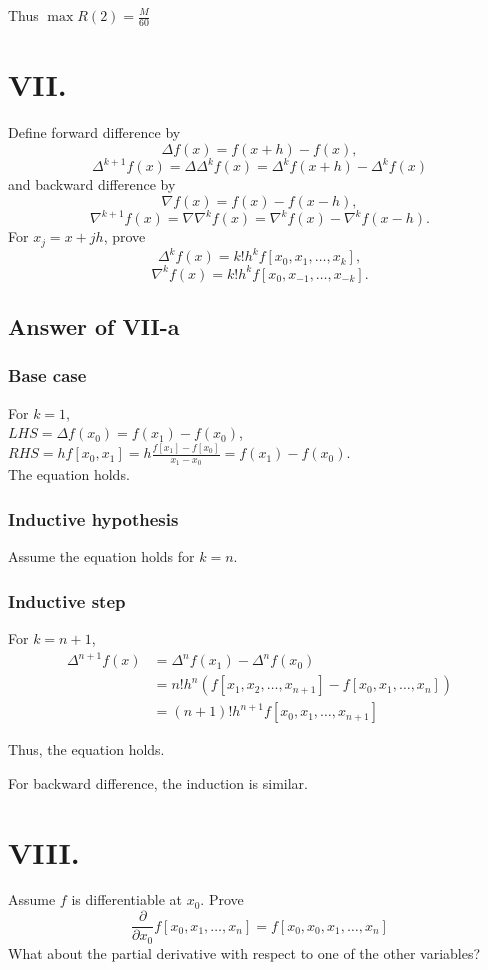 \documentclass[a4paper]{article}
\begin{document}
Thus $\max R(2)=\frac{M}{60} $


\section*{VII.}
Define forward difference by
$$\Delta f (x) = f (x + h) - f (x),$$
$$\Delta^{k+1} f (x) = \Delta \Delta^k f (x) = \Delta^k f (x + h) - \Delta^k f (x)$$
and backward difference by
$$\nabla f (x) = f (x) - f (x - h),$$
$$\nabla^{k+1} f (x) = \nabla \nabla^k f (x) = \nabla^kf (x) - \nabla^k f (x - h).$$
For $x_j = x + jh$, prove
$$\Delta^k f (x) = k! h^k f[x_0, x_1,\ldots , x_k],$$
$$\nabla^k f (x) = k! h^kf [x_0, x_{-1},\ldots, x_{-k}].$$

\subsection*{Answer of VII-a}

\subsubsection*{Base case}
For $k=1$,\\
$LHS=\Delta f(x_0)=f(x_1)-f(x_0)$,\\
$RHS=hf[x_0,x_1]=h\frac{f[x_1]-f[x_0]}{x_1-x_0}=f(x_1)-f(x_0)$.\\
The equation holds.

\subsubsection*{Inductive hypothesis}
Assume the equation holds for $ k=n $.

\subsubsection*{Inductive step}
For $k=n+1$,
\begin{align*}
  \Delta^{n+1}f(x)&=\Delta^nf(x_1)-\Delta^nf(x_0)\\
  &=n!h^n(f[x_1,x_2,\ldots,x_{n+1}]-f[x_0,x_1,\ldots,x_n])\\
  &=(n+1)!h^{n+1}f[x_0,x_1,\ldots,x_{n+1}]
\end{align*}

Thus, the equation holds.

For backward difference, the induction is similar.


\section*{VIII.}
Assume $f$ is diﬀerentiable at $x_0$. Prove
$$\frac{\partial}{\partial x_0}f[x_0,x_1,\ldots,x_n]=f[x_0,x_0,x_1,\ldots,x_n] $$
What about the partial derivative with respect to one
of the other variables?
\end{document}
